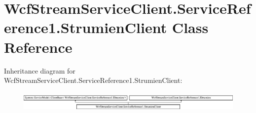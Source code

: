 \hypertarget{class_wcf_stream_service_client_1_1_service_reference1_1_1_strumien_client}{}\section{Wcf\+Stream\+Service\+Client.\+Service\+Reference1.\+Strumien\+Client Class Reference}
\label{class_wcf_stream_service_client_1_1_service_reference1_1_1_strumien_client}
Inheritance diagram for Wcf\+Stream\+Service\+Client.\+Service\+Reference1.\+Strumien\+Client\+:\begin{figure}[H]
\begin{center}
\leavevmode
\includegraphics[height=1.033210cm]{class_wcf_stream_service_client_1_1_service_reference1_1_1_strumien_client}
\end{center}
\end{figure}
